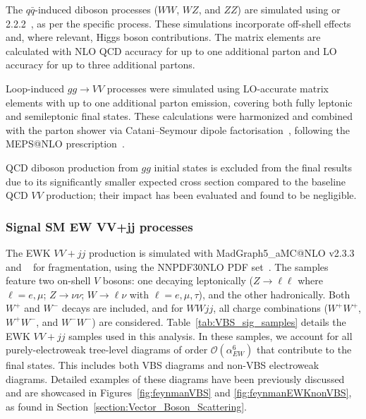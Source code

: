 The $q\bar{q}$-induced diboson processes ($WW$, $WZ$, and $ZZ$) are simulated using \SHERPA[2.2.1] or 2.2.2~\cite{Bothmann:2019yzt}, as per the specific process. 
These simulations incorporate off-shell effects and, where relevant, Higgs boson contributions. 
The matrix elements are calculated with NLO QCD accuracy for up to one additional parton and LO accuracy for up to three additional partons.

Loop-induced $gg \to VV$ processes were simulated using LO-accurate matrix elements with up to one additional parton emission, covering both fully leptonic and semileptonic final states. These calculations were harmonized and combined with the \SHERPA parton shower via Catani--Seymour dipole factorisation~\cite{Gleisberg:2008fv,Schumann:2007mg}, following the MEPS@NLO prescription~\cite{Hoeche:2011fd,Hoeche:2012yf,Catani:2001cc,Hoeche:2009rj}.

QCD diboson production from $gg$ initial states is excluded from the final results due to its significantly smaller expected cross section compared to the baseline QCD $VV$ production; their impact has been evaluated and found to be negligible.


\subsubsection{Signal SM EW VV+jj processes}
\label{sec:mc_sample_ewvvjj}

The EWK $VV+jj$ production is simulated with MadGraph5\_aMC@NLO v2.3.3~\cite{Alwall:2014hca} and ~\cite{Sjostrand:2007gs} for fragmentation, using the \textsc{NNPDF30NLO} PDF set~\cite{Ball:2012cx}. 
The samples feature two on-shell $V$ bosons: one decaying leptonically ($Z \to \ell\ell$ where $\ell = e, \mu$; $Z \to \nu\nu$; $W \to \ell \nu$ with $\ell= e, \mu, \tau$), and the other hadronically. 
Both $W^{+}$ and $W^{-}$ decays are included, and for $WWjj$, all charge combinations ($W^{+}W^{+}$, $W^{+}W^{-}$, and $W^{-}W^{-}$) are considered. 
Table~\ref{tab:VBS_sig_samples} details the EWK $VV+jj$ samples used in this analysis.
In these samples, we account for all purely-electroweak tree-level diagrams of order $\mathcal{O}(\alpha_{EW}^6)$ that contribute to the final states. This includes both VBS diagrams and non-VBS electroweak diagrams. Detailed examples of these diagrams have been previously discussed and are showcased in Figures~\ref{fig:feynmanVBS} and \ref{fig:feynmanEWKnonVBS}, as found in Section~\ref{section:Vector_Boson_Scattering}.


